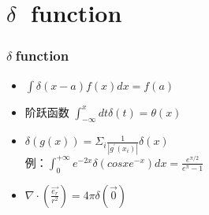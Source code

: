 \documentclass[10pt]{beamer}
\begin{document}
\section{$\delta \; $ function }
\begin{frame}
    \frametitle{$\delta \; $function}
    \begin{itemize}
        \item $\int \delta(x-a) f(x) dx = f(a)$
        \item 阶跃函数 $\int_{-\infty}^x dt \delta(t) = \theta(x) $
        \item $\delta(g(x)) = \Sigma_i \frac{1}{|g^\prime(x_i)|}\delta(x) $\\
        例：$\int_0^{+\infty} e^{-2x} \delta({cos x e^{-x}})dx = \frac{e^{\pi/2}}{e^\pi-1}$
        \item $\nabla \cdot \left( \frac{\vec{e_r}}{r^2}\right) = 4\pi \delta (\vec{0})$
    \end{itemize}
\end{frame}
\end{document}
